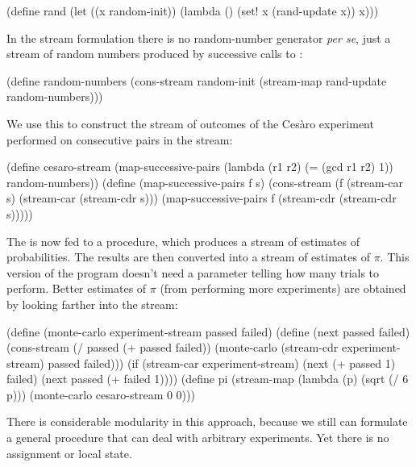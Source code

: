 \begin{codeBlock}
(define rand
  (let ((x random-init))
    (lambda ()
      (set! x (rand-update x))
      x)))
\end{codeBlock}

\noindent
In the stream formulation there is no random-number generator \emph{per se},
just a stream of random numbers produced by successive calls to
:

\begin{codeBlock}
(define random-numbers
  (cons-stream
   random-init
   (stream-map rand-update random-numbers)))
\end{codeBlock}

\noindent
We use this to construct the stream of outcomes of the Ces\`aro experiment
performed on consecutive pairs in the  stream:

\begin{codeBlock}
(define cesaro-stream
  (map-successive-pairs
   (lambda (r1 r2) (= (gcd r1 r2) 1))
   random-numbers))
(define (map-successive-pairs f s)
  (cons-stream
   (f (stream-car s) (stream-car (stream-cdr s)))
   (map-successive-pairs f (stream-cdr (stream-cdr s)))))
\end{codeBlock}

\noindent
The  is now fed to a  procedure, which
produces a stream of estimates of probabilities.  The results are then
converted into a stream of estimates of \( \pi \).  This version of the program
doesn't need a parameter telling how many trials to perform.  Better estimates
of \( \pi \) (from performing more experiments) are obtained by looking farther
into the  stream:

\begin{codeBlock}
(define (monte-carlo experiment-stream passed failed)
  (define (next passed failed)
    (cons-stream
     (/ passed (+ passed failed))
     (monte-carlo
      (stream-cdr experiment-stream) passed failed)))
  (if (stream-car experiment-stream)
      (next (+ passed 1) failed)
      (next passed (+ failed 1))))
(define pi
  (stream-map
   (lambda (p) (sqrt (/ 6 p)))
   (monte-carlo cesaro-stream 0 0)))
\end{codeBlock}

\noindent
There is considerable modularity in this approach, because we still can
formulate a general  procedure that can deal with arbitrary
experiments.  Yet there is no assignment or local state.

